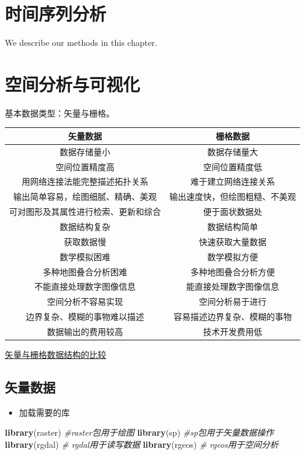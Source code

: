 \documentclass[]{scrbook}
\newenvironment{Shaded}{\begin{snugshade}}{\end{snugshade}}
\newcommand{\CommentTok}[1]{\textcolor[rgb]{0.56,0.35,0.01}{\textit{#1}}}
\newcommand{\KeywordTok}[1]{\textcolor[rgb]{0.13,0.29,0.53}{\textbf{#1}}}
\newcommand{\NormalTok}[1]{#1}
\providecommand{\tightlist}{%
  \setlength{\itemsep}{0pt}\setlength{\parskip}{0pt}}
\begin{document}
\hypertarget{tsd}{%
\chapter{时间序列分析}\label{tsd}}

We describe our methods in this chapter.

\hypertarget{spatial}{%
\chapter{空间分析与可视化}\label{spatial}}

基本数据类型：矢量与栅格。

\begin{longtable}[]{@{}cc@{}}
\toprule
矢量数据 & 栅格数据\tabularnewline
\midrule
\endhead
数据存储量小 & 数据存储量大\tabularnewline
空间位置精度高 & 空间位置精度低\tabularnewline
用网络连接法能完整描述拓扑关系 & 难于建立网络连接关系\tabularnewline
输出简单容易，绘图细腻、精确、美观 & 输出速度快，但绘图粗糙、不美观\tabularnewline
可对图形及其属性进行检索、更新和综合 & 便于面状数据处\tabularnewline
数据结构复杂 & 数据结构简单\tabularnewline
获取数据慢 & 快速获取大量数据\tabularnewline
数学模拟困难 & 数学模拟方便\tabularnewline
多种地图叠合分析困难 & 多种地图叠合分析方便\tabularnewline
不能直接处理数字图像信息 & 能直接处理数字图像信息\tabularnewline
空间分析不容易实现 & 空间分析易于进行\tabularnewline
边界复杂、模糊的事物难以描述 & 容易描述边界复杂、模糊的事物\tabularnewline
数据输出的费用较高 & 技术开发费用低\tabularnewline
\bottomrule
\end{longtable}

\href{https://www.osgeo.cn/gis-tutorial/ch02/02_5.html}{矢量与栅格数据结构的比较}

\hypertarget{ux77e2ux91cfux6570ux636e}{%
\section{矢量数据}\label{ux77e2ux91cfux6570ux636e}}

\begin{itemize}
\tightlist
\item
  加载需要的库
\end{itemize}

\begin{Shaded}
\begin{Highlighting}[]
\KeywordTok{library}\NormalTok{(raster)  }\CommentTok{\#raster包用于绘图}
\KeywordTok{library}\NormalTok{(sp)  }\CommentTok{\#sp包用于矢量数据操作}
\KeywordTok{library}\NormalTok{(rgdal)  }\CommentTok{\# rgdal用于读写数据}
\KeywordTok{library}\NormalTok{(rgeos)  }\CommentTok{\# rgeos用于空间分析}
\end{Highlighting}
\end{Shaded}
\end{document}
